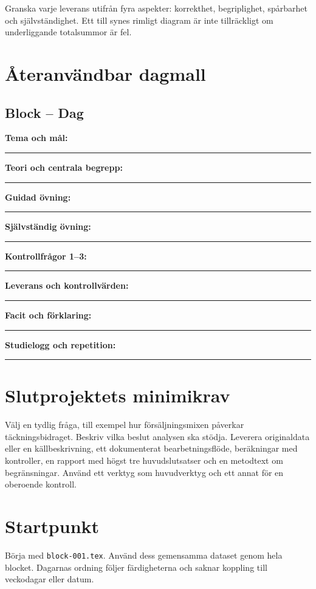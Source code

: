 \documentclass[11pt,a4paper]{article}
\newcommand{\skrivfalt}{\par\vspace{3mm}\hrule\vspace{6mm}}
\begin{document}
Granska varje leverans utifrån fyra aspekter: korrekthet, begriplighet, spårbarhet och självständighet. Ett till synes rimligt diagram är inte tillräckligt om underliggande totalsummor är fel.

\section{Återanvändbar dagmall}
\subsection*{Block \underline{\hspace{12mm}} -- Dag \underline{\hspace{8mm}}}
\textbf{Tema och mål:}\skrivfalt
\textbf{Teori och centrala begrepp:}\skrivfalt
\textbf{Guidad övning:}\skrivfalt
\textbf{Självständig övning:}\skrivfalt
\textbf{Kontrollfrågor 1--3:}\skrivfalt
\textbf{Leverans och kontrollvärden:}\skrivfalt
\textbf{Facit och förklaring:}\skrivfalt
\textbf{Studielogg och repetition:}\skrivfalt

\section{Slutprojektets minimikrav}
Välj en tydlig fråga, till exempel hur försäljningsmixen påverkar täckningsbidraget. Beskriv vilka beslut analysen ska stödja. Leverera originaldata eller en källbeskrivning, ett dokumenterat bearbetningsflöde, beräkningar med kontroller, en rapport med högst tre huvudslutsatser och en metodtext om begränsningar. Använd ett verktyg som huvudverktyg och ett annat för en oberoende kontroll.

\section{Startpunkt}
Börja med \texttt{block-001.tex}. Använd dess gemensamma dataset genom hela blocket. Dagarnas ordning följer färdigheterna och saknar koppling till veckodagar eller datum.
\end{document}
